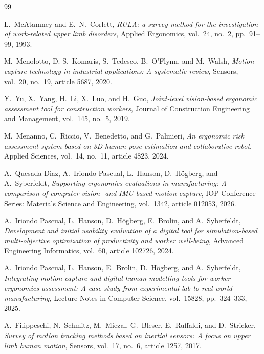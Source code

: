 \documentclass[12pt,a4paper]{article}
\begin{document}
\begin{thebibliography}{99}

L.~McAtamney and E.~N.~Corlett,
\textit{RULA: a survey method for the investigation of work-related upper limb disorders},
Applied Ergonomics, vol.~24, no.~2, pp.~91--99, 1993.

M.~Menolotto, D.-S.~Komaris, S.~Tedesco, B.~O'Flynn, and M.~Walsh,
\textit{Motion capture technology in industrial applications: A systematic review},
Sensors, vol.~20, no.~19, article 5687, 2020.

Y.~Yu, X.~Yang, H.~Li, X.~Luo, and H.~Guo,
\textit{Joint-level vision-based ergonomic assessment tool for construction workers},
Journal of Construction Engineering and Management, vol.~145, no.~5, 2019.

M.~Menanno, C.~Riccio, V.~Benedetto, and G.~Palmieri,
\textit{An ergonomic risk assessment system based on 3D human pose estimation and collaborative robot},
Applied Sciences, vol.~14, no.~11, article 4823, 2024.

A.~Quesada Diaz, A.~Iriondo Pascual, L.~Hanson, D.~H{\"o}gberg, and A.~Syberfeldt,
\textit{Supporting ergonomics evaluations in manufacturing: A comparison of computer vision- and IMU-based motion capture},
IOP Conference Series: Materials Science and Engineering, vol.~1342, article 012053, 2026.

A.~Iriondo Pascual, L.~Hanson, D.~H{\"o}gberg, E.~Brolin, and A.~Syberfeldt,
\textit{Development and initial usability evaluation of a digital tool for simulation-based multi-objective optimization of productivity and worker well-being},
Advanced Engineering Informatics, vol.~60, article 102726, 2024.

A.~Iriondo Pascual, L.~Hanson, E.~Brolin, D.~H{\"o}gberg, and A.~Syberfeldt,
\textit{Integrating motion capture and digital human modelling tools for worker ergonomics assessment: A case study from experimental lab to real-world manufacturing},
Lecture Notes in Computer Science, vol.~15828, pp.~324--333, 2025.

A.~Filippeschi, N.~Schmitz, M.~Miezal, G.~Bleser, E.~Ruffaldi, and D.~Stricker,
\textit{Survey of motion tracking methods based on inertial sensors: A focus on upper limb human motion},
Sensors, vol.~17, no.~6, article 1257, 2017.


\end{thebibliography}
\end{document}
